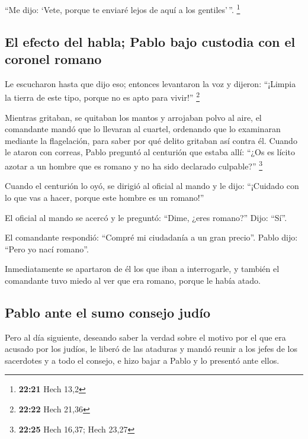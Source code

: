 \begin{paracol}{2}
 ``Me dijo: `Vete, porque te enviaré lejos de aquí a los
gentiles'\,''. \footnote{\textbf{22:21} Hech 13,2}

\hypertarget{el-efecto-del-habla-pablo-bajo-custodia-con-el-coronel-romano}{%
\subsection{El efecto del habla; Pablo bajo custodia con el coronel
romano}\label{el-efecto-del-habla-pablo-bajo-custodia-con-el-coronel-romano}}

 Le escucharon hasta que dijo eso; entonces levantaron la
voz y dijeron: ``¡Limpia la tierra de este tipo, porque no es apto para
vivir!'' \footnote{\textbf{22:22} Hech 21,36}

 Mientras gritaban, se quitaban los mantos y arrojaban
polvo al aire,  el comandante mandó que lo llevaran al
cuartel, ordenando que lo examinaran mediante la flagelación, para saber
por qué delito gritaban así contra él.  Cuando le ataron
con correas, Pablo preguntó al centurión que estaba allí: ``¿Os es
lícito azotar a un hombre que es romano y no ha sido declarado
culpable?'' \footnote{\textbf{22:25} Hech 16,37; Hech 23,27}

 Cuando el centurión lo oyó, se dirigió al oficial al
mando y le dijo: ``¡Cuidado con lo que vas a hacer, porque este hombre
es un romano!''

 El oficial al mando se acercó y le preguntó: ``Dime,
¿eres romano?'' Dijo: ``Sí''.

 El comandante respondió: ``Compré mi ciudadanía a un
gran precio''. Pablo dijo: ``Pero yo nací romano''.

 Inmediatamente se apartaron de él los que iban a
interrogarle, y también el comandante tuvo miedo al ver que era romano,
porque le había atado.

\hypertarget{pablo-ante-el-sumo-consejo-juduxedo}{%
\subsection{Pablo ante el sumo consejo
judío}\label{pablo-ante-el-sumo-consejo-juduxedo}}

 Pero al día siguiente, deseando saber la verdad sobre el
motivo por el que era acusado por los judíos, le liberó de las ataduras
y mandó reunir a los jefes de los sacerdotes y a todo el consejo, e hizo
bajar a Pablo y lo presentó ante ellos.


\end{paracol}
